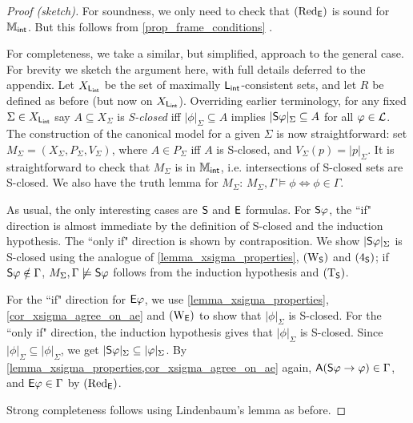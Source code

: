 \begin{proof}[Proof (sketch)]

    For soundness, we only need to check that $\redE$ is sound for $\Mint$. But
    this follows from \cref{prop_frame_conditions}
    .

    For completeness, we take a similar, but simplified, approach to the
    general case. For brevity we sketch the argument here, with full details
    deferred to the appendix.
    Let $X_{\sLint}$ be the set of maximally $\sLint$-consistent
    sets, and let $R$ be defined as before (but now on $X_{\sLint}$).
    Overriding earlier terminology, for any fixed $\Sigma \in X_{\sLint}$ say
    $A \subseteq X_\Sigma$ is \emph{S-closed} iff $|\phi|_\Sigma \subseteq A$
    implies $|\S\phi|_\Sigma \subseteq A$ for all $\phi \in \cL$.
    The construction of the canonical model for a given $\Sigma$ is now
    straightforward: set $M_\Sigma = (X_\Sigma, P_\Sigma, V_\Sigma)$, where $A
    \in P_\Sigma$ iff $A$ is S-closed, and $V_\Sigma(p) = |p|_\Sigma$.
    It is straightforward to check that $M_\Sigma$ is in $\Mint$, i.e.
    intersections of S-closed sets are S-closed. We also have the truth lemma
    for $M_\Sigma$: $M_\Sigma, \Gamma \models \phi \iff \phi \in \Gamma$.

    As usual, the only interesting cases are $\S$ and $\E$ formulas. For
    $\S\phi$, the ``if" direction is almost immediate by the definition of
    S-closed and the induction hypothesis. The ``only if" direction is shown by
    contraposition. We show $|\S\phi|_\Sigma$ is S-closed using the analogue of
    \cref{lemma_xsigma_properties}, $\weakeningS$ and $\foursoundness$; if
    $\S\phi \notin \Gamma$, $M_\Sigma, \Gamma \not\models \S\phi$ follows from
    the induction hypothesis and $\Tsoundness$.

    For the ``if" direction for $\E\phi$, we use
    \cref{lemma_xsigma_properties}, \cref{cor_xsigma_agree_on_ae} and
    $\weakeningE$ to show that $|\phi|_\Sigma$ is S-closed. For the ``only if"
    direction, the induction hypothesis gives that $|\phi|_\Sigma$ is S-closed.
    Since $|\phi|_\Sigma \subseteq |\phi|_\Sigma$, we get $|\S\phi|_\Sigma
    \subseteq |\phi|_\Sigma$. By
    \cref{lemma_xsigma_properties,cor_xsigma_agree_on_ae} again, $\A(\S\phi
    \limplies \phi) \in \Gamma$, and $\E\phi \in \Gamma$ by $\redE$.

    Strong completeness follows using Lindenbaum's lemma as before.

\end{proof}

